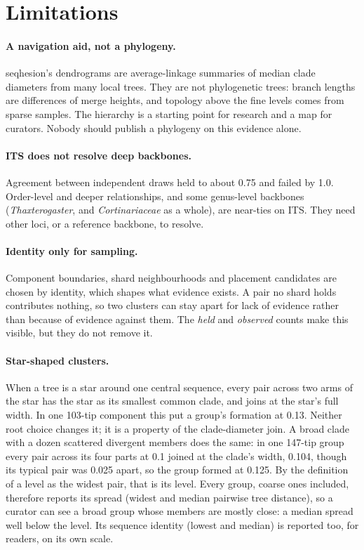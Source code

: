 \documentclass[11pt,a4paper]{article}
\newcommand{\seqhesion}{\textsf{seqhesion}}
\begin{document}
\section{Limitations}\label{sec:limits}

\paragraph{A navigation aid, not a phylogeny.}
\seqhesion's dendrograms are average-linkage summaries of median clade diameters from many local
trees. They are not phylogenetic trees: branch lengths are differences of merge heights, and
topology above the fine levels comes from sparse samples. The hierarchy is a starting point for
research and a map for curators. Nobody should publish a phylogeny on this evidence alone.

\paragraph{ITS does not resolve deep backbones.}
Agreement between independent draws held to about 0.75 and failed by 1.0. Order-level and deeper
relationships, and some genus-level backbones (\emph{Thaxterogaster}, and \emph{Cortinariaceae} as
a whole), are near-ties on ITS. They need other loci, or a reference backbone, to resolve.

\paragraph{Identity only for sampling.}
Component boundaries, shard neighbourhoods and placement candidates are chosen by identity, which
shapes what evidence exists. A pair no shard holds contributes nothing, so two clusters can stay
apart for lack of evidence rather than because of evidence against them. The \emph{held} and
\emph{observed} counts make this visible, but they do not remove it.

\paragraph{Star-shaped clusters.}
When a tree is a star around one central sequence, every pair across two arms of the star has the
star as its smallest common clade, and joins at the star's full width. In one 103-tip component
this put a group's formation at 0.13. Neither root choice changes it; it is a property of the
clade-diameter join. A broad clade with a dozen scattered divergent members does the same: in one
147-tip group every pair across its four parts at 0.1 joined at the clade's width, 0.104, though
its typical pair was 0.025 apart, so the group formed at 0.125. By the definition of a level as
the widest pair, that is its level. Every group, coarse ones included, therefore reports its spread
(widest and median pairwise tree distance), so a curator can see a broad group whose members are
mostly close: a median spread well below the level. Its sequence identity (lowest and median) is
reported too, for readers, on its own scale.
\end{document}
